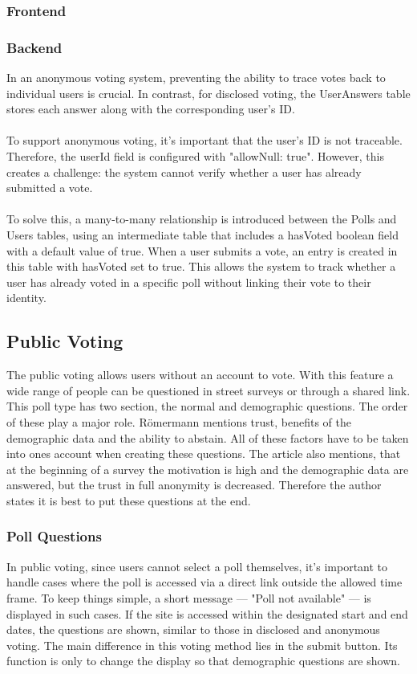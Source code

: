 \documentclass[a4paper,12pt]{report}
\begin{document}
\subsubsection{Frontend}

\subsubsection{Backend}
In an anonymous voting system, preventing the ability to trace votes back to individual users is crucial. In contrast, for disclosed voting, the UserAnswers table stores each answer along with the corresponding user's ID.\\ \\
To support anonymous voting, it's important that the user's ID is not traceable. Therefore, the userId field is configured with "allowNull: true". However, this creates a challenge: the system cannot verify whether a user has already submitted a vote.\\ \\
To solve this, a many-to-many relationship is introduced between the Polls and Users tables, using an intermediate table that includes a hasVoted boolean field with a default value of true. When a user submits a vote, an entry is created in this table with hasVoted set to true. This allows the system to track whether a user has already voted in a specific poll without linking their vote to their identity.

\subsection{Public Voting}
The public voting allows users without an account to vote. With this feature a wide range of people can be questioned in street surveys or through a shared link. This poll type has two section, the normal and demographic questions. The order of these play a major role. Römermann mentions trust, benefits of the demographic data and the ability to abstain. All of these factors have to be taken into ones account when creating these questions. The article also mentions, that at the beginning of a survey the motivation is high and the demographic data are answered, but the trust in full anonymity is decreased. Therefore the author states it is best to put these questions at the end. \cite{demographicdata}

\subsubsection{Poll Questions}
In public voting, since users cannot select a poll themselves, it's important to handle cases where the poll is accessed via a direct link outside the allowed time frame. To keep things simple, a short message — "Poll not available" — is displayed in such cases. If the site is accessed within the designated start and end dates, the questions are shown, similar to those in disclosed and anonymous voting. The main difference in this voting method lies in the submit button. Its function is only to change the display so that demographic questions are shown.
\end{document}
